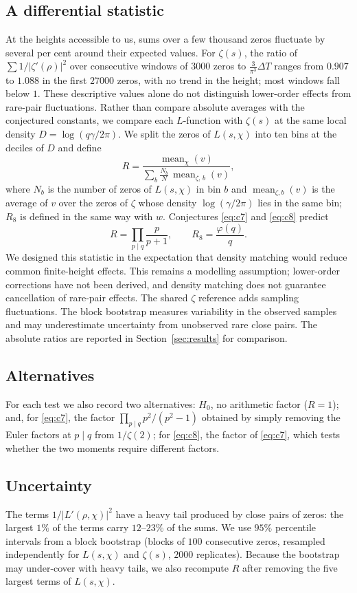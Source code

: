 \documentclass[11pt]{amsart}
\newcommand{\Lp}{L'}
\DeclareMathOperator{\med}{mean}
\begin{document}
\subsection{A differential statistic}
At the heights accessible to us, sums over a few thousand zeros fluctuate by several per cent around their expected
values. For $\zeta(s)$, the ratio of $\sum 1/|\zeta'(\rho)|^2$ over consecutive windows of $3000$ zeros to
$\frac{3}{\pi^3}\Delta T$ ranges from $0.907$ to $1.088$ in the first $27000$ zeros, with no trend in the height; most
windows fall below $1$. These descriptive values alone do not distinguish lower-order effects from rare-pair fluctuations. Rather
than compare absolute averages with the conjectured constants, we compare each $L$-function with $\zeta(s)$ at the
same local density $D=\log(q\gamma/2\pi)$. We split the zeros of $L(s,\chi)$ into ten bins at the
deciles of $D$ and define
\[
R=\frac{\med_{\chi}(v)}{\sum_{b}\frac{N_b}{N}\,\med_{\zeta,\,b}(v)},
\]
where $N_b$ is the number of zeros of $L(s,\chi)$ in bin $b$ and $\med_{\zeta,b}(v)$ is the average of $v$ over the
zeros of $\zeta$ whose density $\log(\gamma/2\pi)$ lies in the same bin; $R_8$ is defined in the same way with $w$.
Conjectures \eqref{eq:c7} and \eqref{eq:c8} predict
\[
R=\prod_{p\mid q}\frac{p}{p+1},\qquad R_8=\frac{\varphi(q)}{q}.
\]
We designed this statistic in the expectation that density matching would reduce common finite-height effects.
This remains a modelling assumption; lower-order corrections have not been derived, and density matching does not
guarantee cancellation of rare-pair effects. The shared $\zeta$ reference adds sampling fluctuations. The block
bootstrap measures variability in the observed samples and may underestimate uncertainty from unobserved rare
close pairs. The absolute ratios are reported in Section~\ref{sec:results} for comparison.

\subsection{Alternatives}
For each test we also record two alternatives: $H_0$, no arithmetic factor ($R=1$); and, for \eqref{eq:c7}, the
factor $\prod_{p\mid q}p^2/(p^2-1)$ obtained by simply removing the Euler factors at $p\mid q$ from $1/\zeta(2)$; for
\eqref{eq:c8}, the factor of \eqref{eq:c7}, which tests whether the two moments require different factors.

\subsection{Uncertainty}
The terms $1/|\Lp(\rho,\chi)|^{2}$ have a heavy tail produced by close pairs of zeros: the largest $1\%$ of the terms
carry $12$--$23\%$ of the sums. We use $95\%$ percentile intervals from a block bootstrap (blocks of $100$ consecutive
zeros, resampled independently for $L(s,\chi)$ and $\zeta(s)$, $2000$ replicates). Because the bootstrap may
under-cover with heavy tails, we also recompute $R$ after removing the five largest terms of $L(s,\chi)$.
\end{document}
